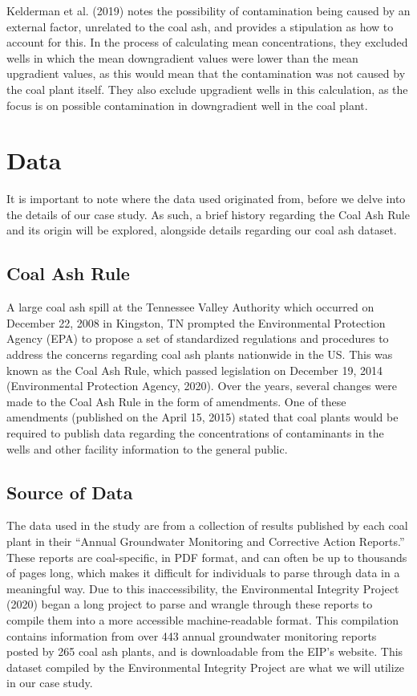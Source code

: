 \documentclass[12pt, twoside]{amherstthesis}
\begin{document}
Kelderman et al. (2019) notes the possibility of contamination being caused by an external factor, unrelated to the coal ash, and provides a stipulation as how to account for this. In the process of calculating mean concentrations, they excluded wells in which the mean downgradient values were lower than the mean upgradient values, as this would mean that the contamination was not caused by the coal plant itself. They also exclude upgradient wells in this calculation, as the focus is on possible contamination in downgradient well in the coal plant.

\hypertarget{data}{%
\section{Data}\label{data}}

It is important to note where the data used originated from, before we delve into the details of our case study. As such, a brief history regarding the Coal Ash Rule and its origin will be explored, alongside details regarding our coal ash dataset.

\hypertarget{coalashrule}{%
\subsection{Coal Ash Rule}\label{coalashrule}}

A large coal ash spill at the Tennessee Valley Authority which occurred on December 22, 2008 in Kingston, TN prompted the Environmental Protection Agency (EPA) to propose a set of standardized regulations and procedures to address the concerns regarding coal ash plants nationwide in the US. This was known as the Coal Ash Rule, which passed legislation on December 19, 2014 (Environmental Protection Agency, 2020). Over the years, several changes were made to the Coal Ash Rule in the form of amendments. One of these amendments (published on the April 15, 2015) stated that coal plants would be required to publish data regarding the concentrations of contaminants in the wells and other facility information to the general public.

\hypertarget{source-of-data}{%
\subsection{Source of Data}\label{source-of-data}}

The data used in the study are from a collection of results published by each coal plant in their ``Annual Groundwater Monitoring and Corrective Action Reports.'' These reports are coal-specific, in PDF format, and can often be up to thousands of pages long, which makes it difficult for individuals to parse through data in a meaningful way. Due to this inaccessibility, the Environmental Integrity Project (2020) began a long project to parse and wrangle through these reports to compile them into a more accessible machine-readable format. This compilation contains information from over 443 annual groundwater monitoring reports posted by 265 coal ash plants, and is downloadable from the EIP's website. This dataset compiled by the Environmental Integrity Project are what we will utilize in our case study.
\end{document}
